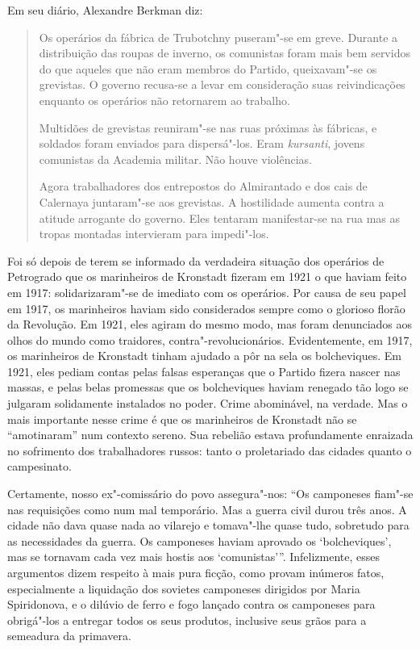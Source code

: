 Em seu diário, Alexandre Berkman diz:

\begin{quote}
Os operários da fábrica de
Trubotchny puseram"-se em greve. Durante a distribuição das roupas de
inverno, os comunistas foram mais bem servidos do que aqueles que não eram
membros do Partido, queixavam"-se os grevistas. O governo recusa-se a levar
em consideração suas reivindicações enquanto os operários não
retornarem ao trabalho. 

Multidões de grevistas reuniram"-se nas ruas
próximas às fábricas, e soldados foram enviados para dispersá"-los.
Eram \textit{kursanti}, jovens comunistas da Academia militar. Não houve
violências.

Agora trabalhadores dos entrepostos do Almirantado e dos cais de
Calernaya juntaram"-se aos grevistas. A hostilidade aumenta contra a
atitude arrogante do governo. Eles tentaram manifestar-se na rua mas as
tropas montadas intervieram para impedi"-los.
\end{quote}

Foi só depois de terem se informado da verdadeira situação dos operários
de Petrogrado que os marinheiros de Kronstadt fizeram em 1921 o que
haviam feito em 1917: solidarizaram"-se de imediato com os operários.
Por causa de seu papel em 1917, os marinheiros haviam sido considerados
sempre como o glorioso florão da Revolução. Em 1921, eles agiram do
mesmo modo, mas foram denunciados aos olhos do mundo como traidores,
contra"-revolucionários. Evidentemente, em 1917, os marinheiros de
Kronstadt tinham ajudado a pôr na sela os bolcheviques. Em 1921, eles
pediam contas pelas falsas esperanças que o Partido fizera nascer nas
massas, e pelas belas promessas que os bolcheviques haviam renegado tão
logo se julgaram solidamente instalados no poder. Crime abominável, na
verdade. Mas o mais importante nesse crime é que os marinheiros de
Kronstadt não se “amotinaram” num contexto sereno. Sua rebelião estava
profundamente enraizada no sofrimento dos trabalhadores russos: tanto o
proletariado das cidades quanto o campesinato.

Certamente, nosso ex"-comissário do povo assegura"-nos: “Os camponeses
fiam"-se nas requisições como num mal temporário. Mas a guerra civil
durou três anos. A cidade não dava quase nada ao vilarejo e
tomava"-lhe quase tudo, sobretudo para as necessidades da guerra. Os
camponeses haviam aprovado os ‘bolcheviques’, mas se tornavam cada vez
mais hostis aos ‘comunistas’”. Infelizmente, esses argumentos dizem
respeito à mais pura ficção, como provam inúmeros fatos, especialmente a
liquidação dos sovietes camponeses dirigidos por Maria Spiridonova, e o 
dilúvio de ferro e fogo lançado contra os camponeses para obrigá"-los
a entregar todos os seus produtos, inclusive seus grãos para a
semeadura da primavera.

